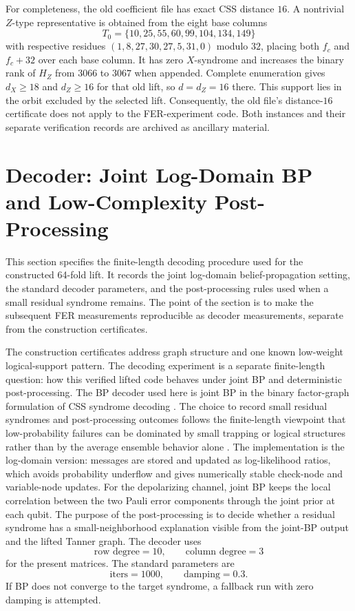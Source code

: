 \documentclass[11pt,a4paper]{article}
\theoremstyle{uprighttheorem}
\begin{document}
For completeness, the old coefficient file has exact CSS distance $16$.
A nontrivial $Z$-type representative is obtained from the eight base columns
\[
T_0=\{10,25,55,60,99,104,134,149\}
\]
with respective residues $(1,8,27,30,27,5,31,0)$ modulo $32$, placing both $f_c$ and $f_c+32$ over each base column.
It has zero $X$-syndrome and increases the binary rank of $H_Z$ from $3066$ to $3067$ when appended.
Complete enumeration gives $d_X\ge18$ and $d_Z\ge16$ for that old lift, so $d=d_Z=16$ there.
This support lies in the orbit excluded by the selected lift.
Consequently, the old file's distance-$16$ certificate does not apply to the FER-experiment code.
Both instances and their separate verification records are archived as ancillary material.

\section{Decoder: Joint Log-Domain BP and Low-Complexity Post-Processing}
\label{sec:decoder}
This section specifies the finite-length decoding procedure used for the constructed 64-fold lift.
It records the joint log-domain belief-propagation setting, the standard decoder parameters, and the post-processing rules used when a small residual syndrome remains.
The point of the section is to make the subsequent FER measurements reproducible as decoder measurements, separate from the construction certificates.

The construction certificates address graph structure and one known low-weight logical-support pattern.
The decoding experiment is a separate finite-length question: how this verified lifted code behaves under joint BP and deterministic post-processing.
The BP decoder used here is joint BP in the binary factor-graph formulation of CSS syndrome decoding \cite{kasai2026factorgraph}.
The choice to record small residual syndromes and post-processing outcomes follows the finite-length viewpoint that low-probability failures can be dominated by small trapping or logical structures rather than by the average ensemble behavior alone \cite{kasai2025errorfloor,komoto2025sharp,kasai2026heuristic}.
The implementation is the log-domain version: messages are stored and updated as log-likelihood ratios, which avoids probability underflow and gives numerically stable check-node and variable-node updates.
For the depolarizing channel, joint BP keeps the local correlation between the two Pauli error components through the joint prior at each qubit.
The purpose of the post-processing is to decide whether a residual syndrome has a small-neighborhood explanation visible from the joint-BP output and the lifted Tanner graph.
The decoder uses
\[
  \text{row degree}=10,\qquad
  \text{column degree}=3
\]
for the present matrices.
The standard parameters are
\[
  \text{iters}=1000,\qquad
  \text{damping}=0.3.
\]
If BP does not converge to the target syndrome, a fallback run with zero damping is attempted.
\end{document}
